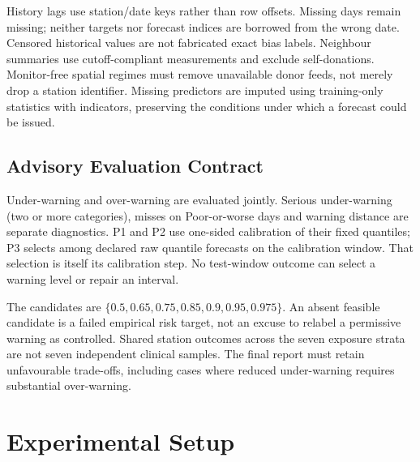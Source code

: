 \documentclass[journal]{IEEEtran}
\begin{document}
History lags use station/date keys rather than row offsets. Missing days remain
missing; neither targets nor forecast indices are borrowed from the wrong date.
Censored historical values are not fabricated exact bias labels. Neighbour
summaries use cutoff-compliant measurements and exclude self-donations.
Monitor-free spatial regimes must remove unavailable donor feeds, not merely
drop a station identifier. Missing predictors are imputed using training-only
statistics with indicators, preserving the conditions under which a forecast
could be issued.

\subsection{Advisory Evaluation Contract}
Under-warning and over-warning are evaluated jointly. Serious under-warning
(two or more categories), misses on Poor-or-worse days and warning distance
are separate diagnostics. P1 and P2 use one-sided calibration of their fixed
quantiles; P3 selects among declared raw quantile forecasts on the calibration
window. That selection is itself its calibration step. No test-window outcome
can select a warning level or repair an interval.

The candidates are $\{0.5,0.65,0.75,0.85,0.9,0.95,0.975\}$.
An absent feasible candidate is a failed empirical risk target, not an excuse
to relabel a permissive warning as controlled. Shared station outcomes across
the seven exposure strata are not seven independent clinical samples.
The final report must retain unfavourable trade-offs, including cases where
reduced under-warning requires substantial over-warning.

\section{Experimental Setup}
\end{document}
